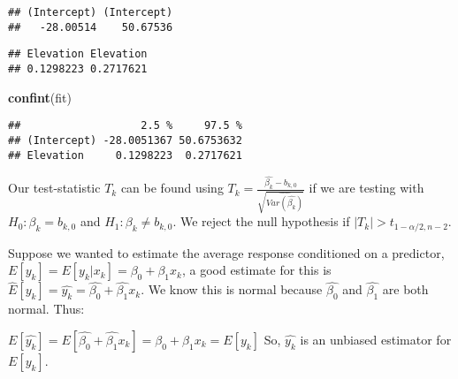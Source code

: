 \documentclass[
]{article}
\newenvironment{Shaded}{\begin{snugshade}}{\end{snugshade}}
\newcommand{\AttributeTok}[1]{\textcolor[rgb]{0.13,0.29,0.53}{#1}}
\newcommand{\DecValTok}[1]{\textcolor[rgb]{0.00,0.00,0.81}{#1}}
\newcommand{\FloatTok}[1]{\textcolor[rgb]{0.00,0.00,0.81}{#1}}
\newcommand{\FunctionTok}[1]{\textcolor[rgb]{0.13,0.29,0.53}{\textbf{#1}}}
\newcommand{\NormalTok}[1]{#1}
\newcommand{\OtherTok}[1]{\textcolor[rgb]{0.56,0.35,0.01}{#1}}
\newcommand{\SpecialCharTok}[1]{\textcolor[rgb]{0.81,0.36,0.00}{\textbf{#1}}}
\begin{document}
\begin{verbatim}
## (Intercept) (Intercept) 
##   -28.00514    50.67536
\end{verbatim}

\begin{Shaded}
\end{Shaded}

\begin{verbatim}
## Elevation Elevation 
## 0.1298223 0.2717621
\end{verbatim}

\begin{Shaded}
\begin{Highlighting}[]
\FunctionTok{confint}\NormalTok{(fit)}
\end{Highlighting}
\end{Shaded}

\begin{verbatim}
##                   2.5 %     97.5 %
## (Intercept) -28.0051367 50.6753632
## Elevation     0.1298223  0.2717621
\end{verbatim}

Our test-statistic \(T_k\) can be found using
\(T_k=\frac{\hat{\beta_k}-b_{k,0}}{\sqrt{\hat{Var(\hat{\beta_k})}}}\) if
we are testing with \(H_0:\beta_k=b_{k,0}\) and
\(H_1:\beta_k \neq b_{k,0}\). We reject the null hypothesis if
\(|T_k| \gt t_{1-\alpha/2,n-2}\).

Suppose we wanted to estimate the average response conditioned on a
predictor, \(E[y_k]=E[y_k|x_k]=\beta_0+\beta_1x_k\), a good estimate for
this is \(\hat{E}[y_k]=\hat{y_k}=\hat{\beta_0}+\hat{\beta_1}x_k\). We
know this is normal because \(\hat{\beta_0}\) and \(\hat{\beta_1}\) are
both normal. Thus:

\(E[\hat{y_k}]=E[\hat{\beta_0}+\hat{\beta_1}x_k]=\beta_0+\beta_1x_k=E[y_k]\)
So, \(\hat{y_k}\) is an unbiased estimator for \(E[y_k]\).
\end{document}
